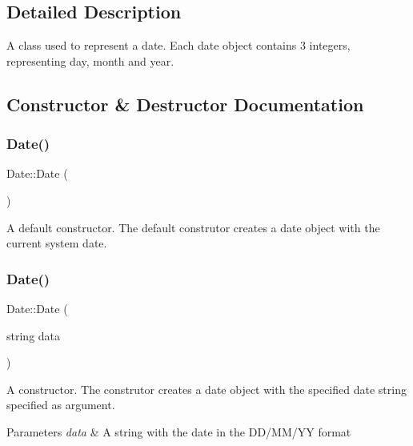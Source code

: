 \subsection{Detailed Description}
A class used to represent a date. Each date object contains 3 integers, representing day, month and year. 

\subsection{Constructor \& Destructor Documentation}
\hypertarget{class_date_a4e59ed4ba66eec61c27460c5d09fa1bd}{}\label{class_date_a4e59ed4ba66eec61c27460c5d09fa1bd} 
\subsubsection{\texorpdfstring{Date()}{Date()}\hspace{0.1cm}{\footnotesize\ttfamily [1/3]}}
{\footnotesize\ttfamily Date\+::\+Date (\begin{DoxyParamCaption}{ }\end{DoxyParamCaption})}

A default constructor. The default construtor creates a date object with the current system date. \hypertarget{class_date_aed0ec4ac9e00fb6130f8a642a61180b9}{}\label{class_date_aed0ec4ac9e00fb6130f8a642a61180b9} 
\subsubsection{\texorpdfstring{Date()}{Date()}\hspace{0.1cm}{\footnotesize\ttfamily [2/3]}}
{\footnotesize\ttfamily Date\+::\+Date (\begin{DoxyParamCaption}\item[{string}]{data }\end{DoxyParamCaption})}

A constructor. The construtor creates a date object with the specified date string specified as argument. 
\begin{DoxyParams}{Parameters}
{\em data} & A string with the date in the D\+D/\+M\+M/\+YY format \\
\hline
\end{DoxyParams}
\hypertarget{class_date_ab1ad19969fa570605a6b0cd32b0da822}{}\label{class_date_ab1ad19969fa570605a6b0cd32b0da822} 
